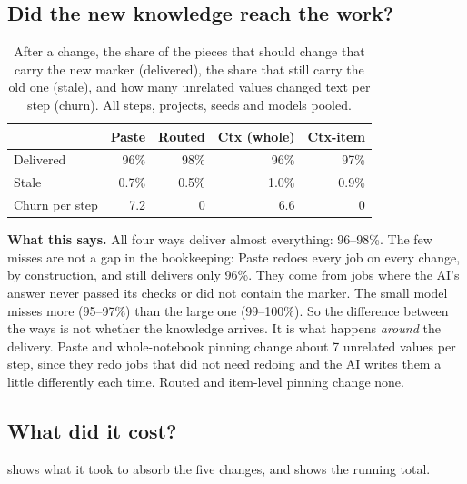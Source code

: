 \documentclass[10pt,a4paper]{article}
\begin{document}
\subsection{Did the new knowledge reach the work?}

\begin{table}[h]
\centering\small
\caption{After a change, the share of the pieces that should change that carry the new marker (delivered), the
share that still carry the old one (stale), and how many unrelated values changed text per step (churn). All steps,
projects, seeds and models pooled.}
\label{tab:delivery}
\begin{tabular}{@{}l r r r r@{}}
\toprule
 & Paste & Routed & Ctx (whole) & Ctx-item \\
\midrule
Delivered & 96\% & 98\% & 96\% & 97\% \\
Stale & 0.7\% & 0.5\% & 1.0\% & 0.9\% \\
Churn per step & 7.2 & 0 & 6.6 & 0 \\
\bottomrule
\end{tabular}
\end{table}

\textbf{What this says.} All four ways deliver almost everything: 96--98\%. The few misses are not a gap in the
bookkeeping: Paste redoes every job on every change, by construction, and still delivers only 96\%. They come
from jobs where the AI's answer never passed its checks or did not contain the marker. The small model misses
more (95--97\%) than the large one (99--100\%). So the difference between the ways is not whether the knowledge
arrives. It is what happens \emph{around} the delivery. Paste and whole-notebook pinning change about 7
unrelated values per step, since they redo jobs that did not need redoing and the AI writes them a little
differently each time. Routed and item-level pinning change none.

\subsection{What did it cost?}

 shows what it took to absorb the five changes, and  shows the running total.
\end{document}
